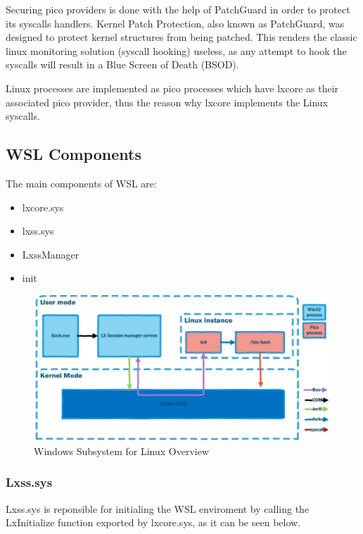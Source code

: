             Securing pico providers is done with the help of PatchGuard in order to protect its syscalls handlers. Kernel Patch Protection,
            also known as PatchGuard, was designed to protect kernel structures from being patched. This renders the classic linux
            monitoring solution (syscall hooking) useless, as any attempt to hook the syscalls will result in a Blue Screen of Death (BSOD).


        Linux processes are implemented as pico processes which have lxcore as their associated pico provider, thus the reason why lxcore
        implements the Linux syscalls.


        \subsection{WSL Components}
            The main components of WSL are:
            \begin{itemize}
                \item lxcore.sys
                \item lxss.sys
                \item LxssManager
                \item init
            \end{itemize}

            \begin{figure}[H]
                \includegraphics[width=\linewidth]{img/wsl_components.png}
                \caption{Windows Subsystem for Linux Overview \protect\cite{WSLComponents}}
                \label{fig:wsl_components}
            \end{figure}

            \subsubsection{Lxss.sys}
            Lxss.sys is reponsible for initialing the WSL enviroment by calling the LxInitialize function exported by lxcore.sys, as it can be
            seen below.

